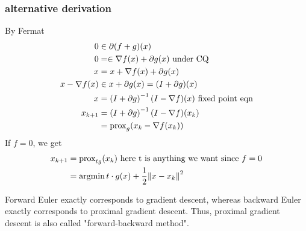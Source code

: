 \documentclass[class=article,crop=false]{standalone}
\begin{document}
\subsubsection{alternative derivation}
By Fermat
\begin{align*}
	0 &\in \partial (f+g)(x)  \\
	0 &= \in \nabla  f(x) + \partial g(x) \text{ under CQ} \\
	x &= x +  \nabla  f(x) + \partial g(x) \\
	x-\nabla f(x) &\in x + \partial g(x) = (I + \partial g)(x)  \\
	x &= \left( I+ \partial g \right) ^{-1} (I - \nabla f)(x) \text{ fixed point eqn} \\
	x_{k+1} &= \left( I+ \partial g \right) ^{-1} (I - \nabla f)(x_k)\\
		&= \operatorname{prox}_g (x_k - \nabla f(x_k)) 
\end{align*}
If $ f = 0$, we get
 \begin{align*}
	 x_{k+1} &= \operatorname{prox}_{t g}(x_k) \text{ here t is anything we want since }f=0 \\
		 &= \operatorname*{argmin} t \cdot g(x) + \frac{1}{2} {\left\lVert{ x-x_k}\right\rVert}^2  \\
\end{align*}
\begin{remark}
Forward Euler exactly corresponds to gradient descent, whereas backward Euler exactly corresponds to proximal gradient descent. Thus, proximal gradient descent is also called "forward-backward method".
\end{remark}
\end{document}
